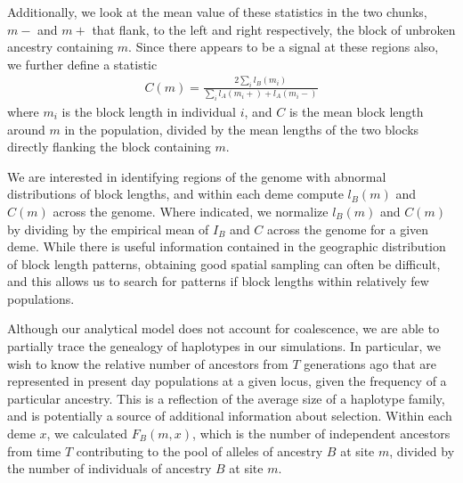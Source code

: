 \documentclass[11pt,letterpaper]{article}
\newcommand{\plr}[1]{{\em \color{blue} #1}}
\begin{document}
Additionally, we look at the mean value of these statistics in the two chunks, $m-$ and $m+$ that flank, to the left and right respectively, the block of unbroken ancestry containing $m$. Since there appears to be a signal at these regions also, we further define a statistic 
\begin{align*}
C(m) =  \frac{2\sum_i{l_B(m_i)}}{\sum_i{l_A(m_i+)+l_A(m_i-)}}
\end{align*}
where $m_i$ is the block length in individual $i$, and $C$ is  the mean block length around $m$ in the population, divided by the mean lengths of  the two blocks directly flanking the block containing $m$. 

We are interested in identifying regions of the genome with abnormal distributions of block lengths, and within each deme compute $l_B(m)$ and $C(m)$ across the genome. Where indicated, we normalize $l_B(m)$ and $C(m)$ by dividing by the empirical mean of $I_B$ and $C$ across the genome for a given deme. 
While there is useful information contained in the geographic distribution of block length patterns, obtaining good spatial sampling can often be difficult, and this allows us to search for  patterns if block lengths within relatively few populations. 

Although our analytical model does not account for coalescence, we are able to partially trace the genealogy of haplotypes in our simulations. In particular, we wish to know the relative number of ancestors from $T$ generations ago that are represented in present day populations at a given locus, given the frequency of a particular ancestry. This is a reflection of the average size of a haplotype family, and is potentially a source of additional information about selection. Within each deme $x$, we calculated $F_B(m,x)$, which is the number of independent ancestors from time $T$ contributing to the pool of alleles of ancestry $B$ at site $m$, divided by the number of individuals of ancestry $B$ at site $m$.


\end{document}
